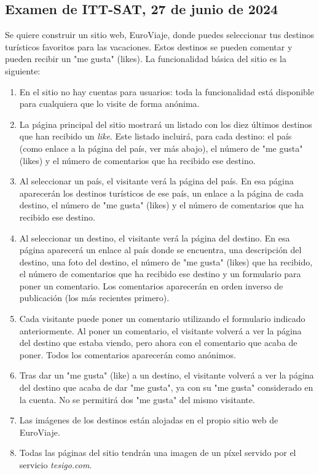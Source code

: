 \subsection{Examen de ITT-SAT, 27 de junio de 2024}

Se quiere construir un sitio web, EuroViaje, donde puedes seleccionar tus destinos turísticos favoritos para las vacaciones. Estos destinos se pueden comentar y pueden recibir un "me gusta" (likes). La funcionalidad básica del sitio es la siguiente:

\begin{enumerate}
  \item En el sitio no hay cuentas para usuarios: toda la funcionalidad está disponible para cualquiera que lo visite de forma anónima.
  \item La página principal del sitio mostrará un listado con los diez últimos destinos que han recibido un \emph{like}. Este listado incluirá, para cada destino: el país (como enlace a la página del país, ver más abajo), el número de "me gusta" (likes) y el número de comentarios que ha recibido ese destino.
  \item Al seleccionar un país, el visitante verá la página del país. En esa página aparecerán los destinos turísticos de ese país, un enlace a la página de cada destino, el número de "me gusta" (likes) y el número de comentarios que ha recibido ese destino.
  \item Al seleccionar un destino, el visitante verá la página del destino. En esa página aparecerá un enlace al país donde se encuentra, una descripción del destino, una foto del destino, el número de "me gusta" (likes) que ha recibido, el número de comentarios que ha recibido ese destino y un formulario para poner un comentario. Los comentarios aparecerán en orden inverso de publicación (los más recientes primero).
  \item Cada visitante puede poner un comentario utilizando el formulario indicado anteriormente. Al poner un comentario, el visitante volverá a ver la página del destino que estaba viendo, pero ahora con el comentario que acaba de poner. Todos los comentarios aparecerán como anónimos.
  \item Tras dar un "me gusta" (like) a un destino, el visitante volverá a ver la página del destino que acaba de dar "me gusta", ya con su "me gusta" considerado en la cuenta. No se permitirá dos "me gusta" del mismo visitante.
  \item Las imágenes de los destinos están alojadas en el propio sitio web de EuroViaje.
  \item Todas las páginas del sitio tendrán una imagen de un píxel servido por el servicio \emph{tesigo.com}.
\end{enumerate}

